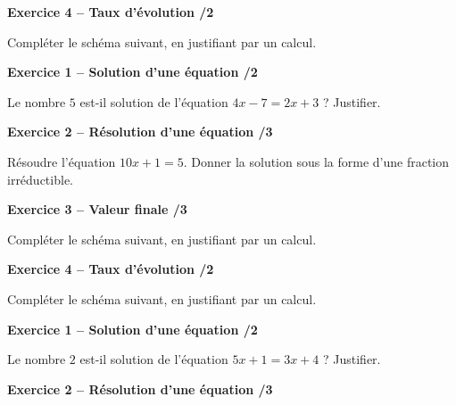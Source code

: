 \documentclass[10pt,a4paper]{article}
\begin{document}

\vspace{3.5cm}

\textbf{Exercice 4 -- Taux d'évolution \hfill /2}

Compléter le schéma suivant, en justifiant par un calcul.


\newpage



\textbf{Exercice 1 -- Solution d'une équation \hfill /2}

Le nombre \(5\) est-il solution de l'équation \(4x-7=2x+3\) ? Justifier.

\vspace{4cm}

\textbf{Exercice 2 -- Résolution d'une équation \hfill /3}

Résoudre l'équation \(10x+1=5\). Donner la solution sous la forme d'une fraction irréductible.

\vspace{4cm}

\textbf{Exercice 3 -- Valeur finale \hfill /3}

Compléter le schéma suivant, en justifiant par un calcul.


\vspace{3.5cm}

\textbf{Exercice 4 -- Taux d'évolution \hfill /2}

Compléter le schéma suivant, en justifiant par un calcul.


\newpage



\textbf{Exercice 1 -- Solution d'une équation \hfill /2}

Le nombre \(2\) est-il solution de l'équation \(5x+1=3x+4\) ? Justifier.

\vspace{4cm}

\textbf{Exercice 2 -- Résolution d'une équation \hfill /3}
\end{document}
